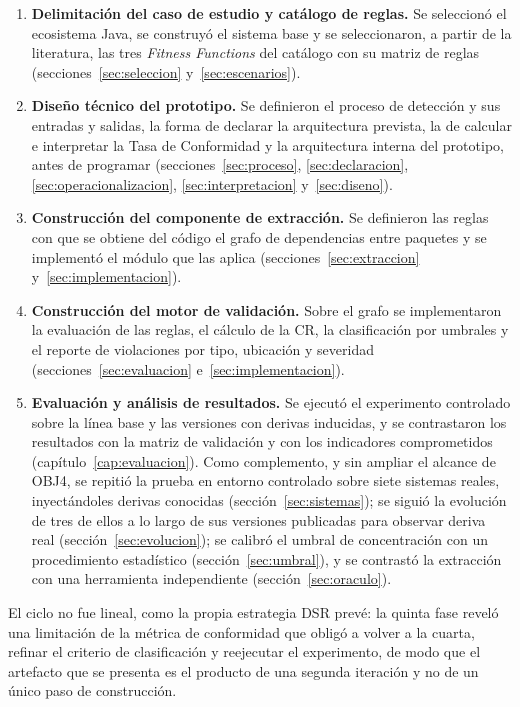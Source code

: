 \begin{enumerate}
    \item \textbf{Delimitación del caso de estudio y catálogo de reglas.} Se seleccionó el ecosistema Java, se construyó el sistema base y se seleccionaron, a partir de la literatura, las tres \textit{Fitness Functions} del catálogo con su matriz de reglas (secciones~\ref{sec:seleccion} y~\ref{sec:escenarios}).
    \item \textbf{Diseño técnico del prototipo.} Se definieron el proceso de detección y sus entradas y salidas, la forma de declarar la arquitectura prevista, la de calcular e interpretar la Tasa de Conformidad y la arquitectura interna del prototipo, antes de programar (secciones~\ref{sec:proceso}, \ref{sec:declaracion}, \ref{sec:operacionalizacion}, \ref{sec:interpretacion} y~\ref{sec:diseno}).
    \item \textbf{Construcción del componente de extracción.} Se definieron las reglas con que se obtiene del código el grafo de dependencias entre paquetes y se implementó el módulo que las aplica (secciones~\ref{sec:extraccion} y~\ref{sec:implementacion}).
    \item \textbf{Construcción del motor de validación.} Sobre el grafo se implementaron la evaluación de las reglas, el cálculo de la CR, la clasificación por umbrales y el reporte de violaciones por tipo, ubicación y severidad (secciones~\ref{sec:evaluacion} e~\ref{sec:implementacion}).
    \item \textbf{Evaluación y análisis de resultados.} Se ejecutó el experimento controlado sobre la línea base y las versiones con derivas inducidas, y se contrastaron los resultados con la matriz de validación y con los indicadores comprometidos (capítulo~\ref{cap:evaluacion}). Como complemento, y sin ampliar el alcance de OBJ4, se repitió la prueba en entorno controlado sobre siete sistemas reales, inyectándoles derivas conocidas (sección~\ref{sec:sistemas}); se siguió la evolución de tres de ellos a lo largo de sus versiones publicadas para observar deriva real (sección~\ref{sec:evolucion}); se calibró el umbral de concentración con un procedimiento estadístico (sección~\ref{sec:umbral}), y se contrastó la extracción con una herramienta independiente (sección~\ref{sec:oraculo}).
\end{enumerate}

El ciclo no fue lineal, como la propia estrategia DSR prevé: la quinta fase reveló una limitación de la métrica de conformidad que obligó a volver a la cuarta, refinar el criterio de clasificación y reejecutar el experimento, de modo que el artefacto que se presenta es el producto de una segunda iteración y no de un único paso de construcción.

